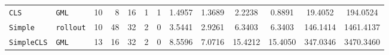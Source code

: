 \begin{table}[H]
\begin{tabular}{
l
l
r
r
r
r
r
S[table-format=1.4]
S[table-format=1.4]
S[table-format=2.4]
S[table-format=2.4]
S[table-format=3.4]
S[table-format=4.4]
}
\texttt{CLS} & \texttt{GML} & 10 & 8 & 16 & 1 & 1 & 1.4957 & 1.3689 & 2.2238 & 0.8891 & 19.4052 & 194.0524 \\
\texttt{Simple} & \texttt{rollout} & \textcolor{gray!55}{10} & 48 & \textcolor{gray!55}{32} & \textcolor{gray!55}{2} & \textcolor{gray!55}{0} & 3.5441 & 2.9261 & 6.3403 & 6.3403 & 146.1414 & 1461.4137 \\
\texttt{SimpleCLS} & \texttt{GML} & 13 & \textcolor{gray!55}{16} & \textcolor{gray!55}{32} & \textcolor{gray!55}{2} & \textcolor{gray!55}{0} & 8.5596 & 7.0716 & 15.4212 & 15.4050 & 347.0346 & 3470.3460 \\
\bottomrule
\end{tabular}
\end{table}
